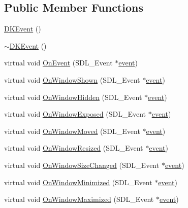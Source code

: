 \subsection*{Public Member Functions}
\begin{DoxyCompactItemize}
\item 
\hyperlink{class_d_k_event_acf5557cea1da441bb740522c8cd3502f}{D\-K\-Event} ()
\item 
\hyperlink{class_d_k_event_a8493c029e4b4d8b0511874cb8cac588d}{$\sim$\-D\-K\-Event} ()
\item 
virtual void \hyperlink{class_d_k_event_a90182b3c8852af08a1154e7795787081}{On\-Event} (S\-D\-L\-\_\-\-Event $\ast$\hyperlink{class_d_k_event_a3deebb932ed734363c4ece87971bc45f}{event})
\item 
virtual void \hyperlink{class_d_k_event_afab8e8af18393b25d7c31a28db664bab}{On\-Window\-Shown} (S\-D\-L\-\_\-\-Event $\ast$\hyperlink{class_d_k_event_a3deebb932ed734363c4ece87971bc45f}{event})
\item 
virtual void \hyperlink{class_d_k_event_aee70b22d939142ddd76da57b6db6865a}{On\-Window\-Hidden} (S\-D\-L\-\_\-\-Event $\ast$\hyperlink{class_d_k_event_a3deebb932ed734363c4ece87971bc45f}{event})
\item 
virtual void \hyperlink{class_d_k_event_aca58d815868378b507aa0ebd46a45f8f}{On\-Window\-Exposed} (S\-D\-L\-\_\-\-Event $\ast$\hyperlink{class_d_k_event_a3deebb932ed734363c4ece87971bc45f}{event})
\item 
virtual void \hyperlink{class_d_k_event_a9691e8e9ffc55df5c300449edc101fa1}{On\-Window\-Moved} (S\-D\-L\-\_\-\-Event $\ast$\hyperlink{class_d_k_event_a3deebb932ed734363c4ece87971bc45f}{event})
\item 
virtual void \hyperlink{class_d_k_event_a6510a3c6f4357617709af58043d9a834}{On\-Window\-Resized} (S\-D\-L\-\_\-\-Event $\ast$\hyperlink{class_d_k_event_a3deebb932ed734363c4ece87971bc45f}{event})
\item 
virtual void \hyperlink{class_d_k_event_a00581ae90c29f329a75f642d460ee7a9}{On\-Window\-Size\-Changed} (S\-D\-L\-\_\-\-Event $\ast$\hyperlink{class_d_k_event_a3deebb932ed734363c4ece87971bc45f}{event})
\item 
virtual void \hyperlink{class_d_k_event_a911d8b463de994da188124cc28d25038}{On\-Window\-Minimized} (S\-D\-L\-\_\-\-Event $\ast$\hyperlink{class_d_k_event_a3deebb932ed734363c4ece87971bc45f}{event})
\item 
virtual void \hyperlink{class_d_k_event_a2ce9aa8d793f1f0eb13a5fa46f0c2103}{On\-Window\-Maximized} (S\-D\-L\-\_\-\-Event $\ast$\hyperlink{class_d_k_event_a3deebb932ed734363c4ece87971bc45f}{event})

\end{DoxyCompactItemize}
